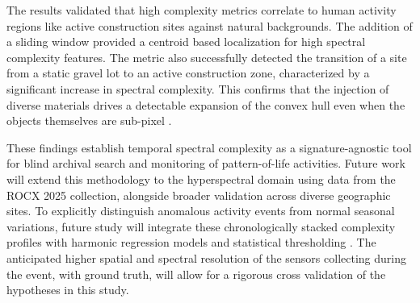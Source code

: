 \documentclass[conference,a4paper]{IEEEtran}
\begin{document}
The results validated that high complexity metrics correlate to human activity regions like active construction sites against natural backgrounds. The addition of a sliding window provided a centroid based localization for high spectral complexity features. The metric also successfully detected the transition of a site from a static gravel lot to an active construction zone, characterized by a significant increase in spectral complexity. This confirms that the injection of diverse materials drives a detectable expansion of the convex hull even when the objects themselves are sub-pixel \cite{messinger_metrics_2012}.

These findings establish temporal spectral complexity as a signature-agnostic tool for blind archival search and monitoring of pattern-of-life activities. %
Future work will extend this methodology to the hyperspectral domain using data from the ROCX 2025 collection, alongside broader validation across diverse geographic sites. To explicitly distinguish anomalous activity events from normal seasonal variations, future study will integrate these chronologically stacked complexity profiles with harmonic regression models and statistical thresholding \cite{pasquarella_demystifying_2022}. %
The anticipated higher spatial and spectral resolution of the sensors collecting during the event, with ground truth, will allow for a rigorous cross validation of the hypotheses in this study. 

\FloatBarrier


\end{document}
